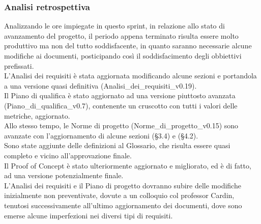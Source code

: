 \newpage
\subsubsection{Analisi retrospettiva}
Analizzando le ore impiegate in questo sprint, in relazione allo stato di avanzamento del progetto, il periodo appena terminato risulta essere molto produttivo ma non del tutto soddisfacente, in quanto saranno necessarie alcune modifiche ai documenti, posticipando così il soddisfacimento degli obbiettivi prefissati.\\
L'Analisi dei requisiti è stata aggiornata modificando alcune sezioni e portandola a una versione quasi definitiva (Analisi\_dei\_requisiti\_v0.19).\\
Il Piano di qualifica è stato aggiornato ad una versione piuttosto avanzata (Piano\_di\_qualifica\_v0.7), contenente un cruscotto con tutti i valori delle metriche, aggiornato.\\
Allo stesso tempo, le Norme di progetto (Norme\_di\_progetto\_v0.15) sono avanzate con l'aggiornamento di alcune sezioni (§3.4) e (§4.2).\\
Sono state aggiunte delle definizioni al Glossario, che risulta essere quasi completo e vicino all'approvazione finale.\\
Il Proof of Concept è stato ulteriormente aggiornato e migliorato, ed è di fatto, ad una versione potenzialmente finale.\\
L'Analisi dei requisiti e il Piano di progetto dovranno subire delle modifiche inizialmente non preventivate, dovute a un colloquio col professor Cardin, tenutosi successivamente all'ultimo aggiornamento dei documenti, dove sono emerse alcune imperfezioni nei diversi tipi di requisiti.\\

\newpage